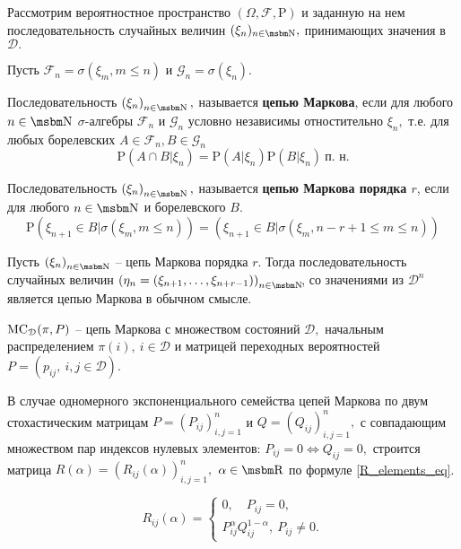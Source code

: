 Рассмотрим вероятностное пространство $(\Omega, \mathcal{F}, \mathrm{P})$
и заданную на нем последовательность случайных величин $(\xi_n)_{n \in \N},$ принимающих значения в $\mathcal{D}.$

Пусть $\mathcal{F}_n = \sigma(\xi_m, m \leq n)$ и $\mathcal{G}_n = \sigma(\xi_n).$

\begin{opr}
Последовательность $\left(\xi_n\right)_{n \in \N},$ называется \textbf{цепью Маркова}, если для любого $n \in \N$ $\sigma\!$-алгебры $\mathcal{F}_n$ и $\mathcal{G}_n$ условно независимы отностительно $\xi_n,$ т.е. для любых борелевских $A \in \mathcal{F}_n, B \in \mathcal{G}_n$ 
$$\mathrm{P} (A \cap B | \xi_n) = \mathrm{P} (A | \xi_n) \mathrm{P} (B | \xi_n) \ \textrm{п. н.}$$
\end{opr}

\begin{opr}
Последовательность $\left(\xi_n\right)_{n \in \N},$ называется \textbf{цепью Маркова порядка \boldmath$r$}, если для любого $n \in \N$ и борелевского $B.$ 
$$\mathrm{P} (\xi_{n + 1} \in B | \sigma(\xi_m, m \leq n)) = (\xi_{n + 1} \in B | \sigma(\xi_m, n - r + 1 \leq m \leq n))$$
\end{opr}

\begin{lem}
Пусть $\left(\xi_n\right)_{n \in \N}$ -- цепь Маркова порядка $r.$ Тогда последовательность случайных величин $\left(\eta_n = (\xi_{n+1},\ldots, \xi_{n+r-1})\right)_{n \in \N} \!$, со значениями из $\mathcal{D}^n$ является цепью Маркова в обычном смысле. 
\end{lem}

$\mathrm{MC}_\mathcal{D}(\pi, P)$ -- цепь Маркова с множеством состояний $\mathcal{D}, $ начальным распределением $\pi(i), \ i \in \mathcal{D}$ и матрицей переходных вероятностей $P = (p_{ij}, \ i, j \in \mathcal{D}).$

В случае одномерного экспоненциального семейства цепей Маркова по двум стохастическим матрицам $P = (P_{ij})_{i, j = 1}^n$ и $Q = (Q_{ij})_{i, j = 1}^n,$ с совпадающим множеством пар индексов нулевых элементов: $P_{ij} = 0 \Longleftrightarrow Q_{ij} = 0,$ строится матрица $R(\alpha) = (R_{ij}(\alpha))_{i, j = 1}^n,$ $\alpha \in \R$ по формуле \eqref{R_elements_eq}.

\begin{equation}
\label{R_elements_eq}
R_{ij} (\alpha) = \begin{cases}
0, \quad P_{ij} = 0, \\
P_{ij}^\alpha Q_{ij}^{1-\alpha},\  P_{ij} \neq 0.
\end{cases}
\end{equation}

